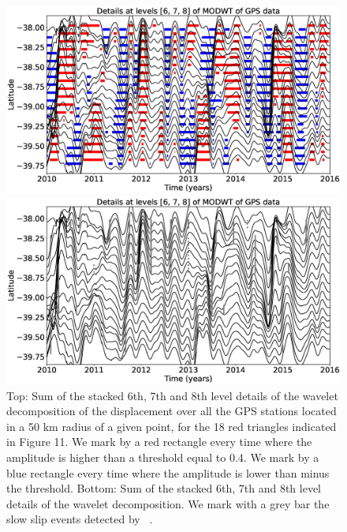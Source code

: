 \documentclass{article}
\begin{document}
\begin{figure}
\noindent\includegraphics[width=\textwidth, trim={0cm 0cm 0cm 0cm},clip]{figures/GPS_NZ_details_6-7-8_without_events.eps}

\noindent\includegraphics[width=\textwidth, trim={0cm 0cm 0cm 0cm},clip]{figures/GPS_NZ_details_6-7-8_only_events.eps}
\caption{Top: Sum of the stacked 6th, 7th and 8th level details of the wavelet decomposition of the displacement over all the GPS stations located in a 50 km radius of a given point, for the 18 red triangles indicated in Figure 11. We mark by a red rectangle every time where the amplitude is higher than a threshold equal to 0.4. We mark by a blue rectangle every time where the amplitude is lower than minus the threshold. Bottom: Sum of the stacked 6th, 7th and 8th level details of the wavelet decomposition. We mark with a grey bar the slow slip events detected by ~\citet{TOD_2016}.}
\label{pngfiguresample}
\end{figure}
\end{document}
